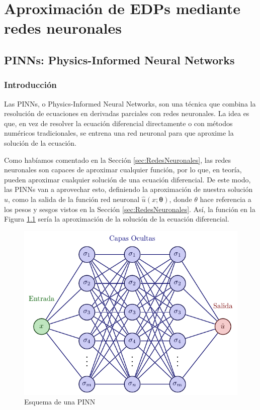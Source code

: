 \documentclass[a4paper,11pt,spanish, twoside, leqno]{tfg-uam}
\theoremstyle{definition}
\begin{document}
\chapter{Aproximación de EDPs mediante redes neuronales}\label{chap2}

\section{PINNs: Physics-Informed Neural Networks}\label{sec:PINN}
\subsection{Introducción}
Las PINNs, o Physics-Informed Neural Networks, son una técnica que combina la resolución de ecuaciones en derivadas parciales con redes neuronales. La idea es que, en vez de resolver la ecuación diferencial directamente o con métodos numéricos tradicionales, se entrena una red neuronal para que aproxime la solución de la ecuación. 

Como habíamos comentado en la Sección \ref{sec:RedesNeuronales}, las redes neuronales son capaces de aproximar cualquier función, por lo que, en teoría, pueden aproximar cualquier solución de una ecuación diferencial. De este modo, las PINNs van a aprovechar esto, definiendo la aproximación de nuestra solución ${u}$, como la salida de la función red neuronal $\hat{u}(x;\mathbf{\theta})$,  donde $\theta$ hace referencia a los pesos y sesgos vistos en la Sección \ref{sec:RedesNeuronales}. Así, la función en la Figura \ref{fig:PIN} sería la aproximación de la solución de la ecuación diferencial.
\begin{figure}[htbp]
    \centering
    \includegraphics[scale=0.6]{Figuras/neural_network_improved.pdf}
    \caption{Esquema de una PINN}
    \label{fig:PIN}
\end{figure}
\end{document}

